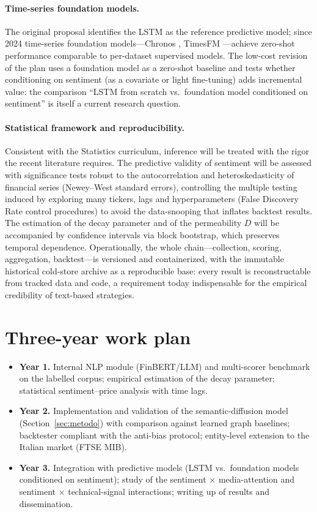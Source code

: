 \documentclass[a4paper,11pt]{article}
\begin{document}
\paragraph{Time-series foundation models.} The original proposal identifies the LSTM as the reference predictive model; since 2024 time-series foundation models---Chronos \parencite{ansari2024chronos}, TimesFM \parencite{das2024timesfm}---achieve zero-shot performance comparable to per-dataset supervised models. The low-cost revision of the plan uses a foundation model as a zero-shot baseline and tests whether conditioning on sentiment (as a covariate or light fine-tuning) adds incremental value: the comparison ``LSTM from scratch vs.\ foundation model conditioned on sentiment'' is itself a current research question.

\paragraph{Statistical framework and reproducibility.} Consistent with the Statistics curriculum, inference will be treated with the rigor the recent literature requires. The predictive validity of sentiment will be assessed with significance tests robust to the autocorrelation and heteroskedasticity of financial series (Newey--West standard errors), controlling the multiple testing induced by exploring many tickers, lags and hyperparameters (False Discovery Rate control procedures) to avoid the data-snooping that inflates backtest results. The estimation of the decay parameter and of the permeability $D$ will be accompanied by confidence intervals via block bootstrap, which preserves temporal dependence. Operationally, the whole chain---collection, scoring, aggregation, backtest---is versioned and containerized, with the immutable historical cold-store archive as a reproducible base: every result is reconstructable from tracked data and code, a requirement today indispensable for the empirical credibility of text-based strategies.

\section{Three-year work plan}

\begin{itemize}\setlength\itemsep{0.15em}
  \item \textbf{Year 1.} Internal NLP module (FinBERT/LLM) and multi-scorer benchmark on the labelled corpus; empirical estimation of the decay parameter; statistical sentiment--price analysis with time lags.
  \item \textbf{Year 2.} Implementation and validation of the semantic-diffusion model (Section~\ref{sec:metodo}) with comparison against learned graph baselines; backtester compliant with the anti-bias protocol; entity-level extension to the Italian market (FTSE MIB).
  \item \textbf{Year 3.} Integration with predictive models (LSTM vs.\ foundation models conditioned on sentiment); study of the sentiment $\times$ media-attention and sentiment $\times$ technical-signal interactions; writing up of results and dissemination.
\end{itemize}
\end{document}
